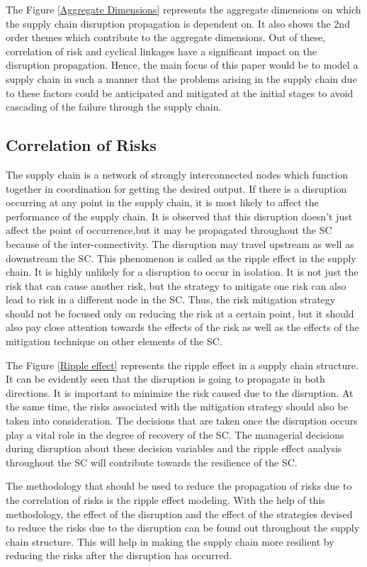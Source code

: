 The Figure \ref{Aggregate Dimensions} represents the aggregate dimensions on which the supply chain disruption propagation is dependent on. It also shows the 2nd order themes which contribute to the aggregate dimensions. Out of these, correlation of risk and cyclical linkages have a significant impact on the disruption propagation. Hence, the main focus of this paper would be to model a supply chain in such a manner that the problems arising in the supply chain due to these factors could be anticipated and mitigated at the initial stages to avoid cascading of the failure through the supply chain.

\subsection{Correlation of Risks}
The supply chain is a network of strongly interconnected nodes which function together in coordination for getting the desired output. If there is a disruption occurring at any point in the supply chain, it is most likely to affect the performance of the supply chain. It is observed that this disruption doesn't just affect the point of occurrence,but it may be propagated throughout the SC because of the inter-connectivity. The disruption may travel upstream as well as downstream the SC. This phenomenon is called as the ripple effect in the supply chain. It is highly unlikely for a disruption to occur in isolation. It is not just the risk that can cause another risk, but the strategy to mitigate one risk can also lead to risk in a different node in the SC. Thus, the risk mitigation strategy should not be focused only on reducing the risk at a certain point, but it should also pay close attention towards the effects of the risk as well as the effects of the mitigation technique on other elements of the SC.

The Figure \ref{Ripple effect} represents the ripple effect in a supply chain structure. It can be evidently seen that the disruption is going to propagate in both directions. It is important to minimize the risk caused due to the disruption. At the same time, the risks associated with the mitigation strategy should also be taken into consideration. The decisions that are taken once the disruption occurs play a vital role in the degree of recovery of the SC. The managerial decisions during disruption about these decision variables and the ripple effect analysis throughout the SC will contribute towards the resilience of the SC.

The methodology that should be used to reduce the propagation of risks due to the correlation of risks is the ripple effect modeling. With the help of this methodology, the effect of the disruption and the effect of the strategies devised to reduce the risks due to the disruption can be found out throughout the supply chain structure. This will help in making the supply chain more resilient by reducing the risks after the disruption has occurred.

